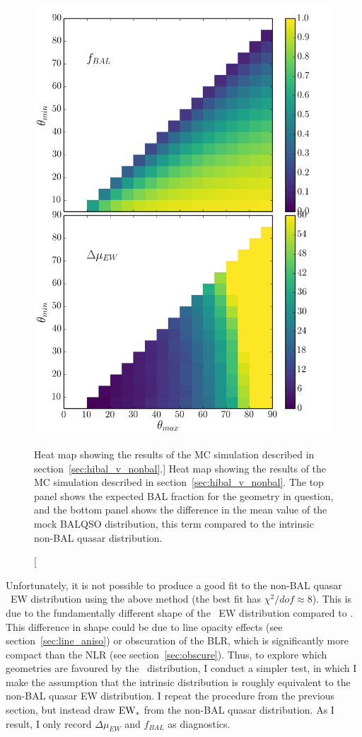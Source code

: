 \begin{figure} %
\centering
\includegraphics[width=1.0\textwidth]{figures/ewpaper/faceon_ew_c4_faceon_sdss.png}
\caption
[Heat map showing the results of the MC simulation described in 
section~\ref{sec:hibal_v_nonbal}.]
{
Heat map showing the results of the MC simulation described in 
section~\ref{sec:hibal_v_nonbal}. The top panel shows the expected 
BAL fraction for the geometry in question, and the bottom
panel shows the difference in the mean value of the mock BALQSO distribution,
this term compared to the intrinsic non-BAL quasar distribution.
}
\label{fig:c4_faceon}
\end{figure} %

Unfortunately, it is not possible to produce a good fit to 
the non-BAL quasar \civline\ EW distribution using the above method 
(the best fit has $\chi^2/dof\approx8$).
This is due to the fundamentally different shape of the \civ\ EW distribution 
compared to \oiii. This difference in shape could be due to line opacity effects 
(see section~\ref{sec:line_aniso}) or obscuration of the BLR, which is significantly
more compact than the NLR (see section~\ref{sec:obscure}).
Thus, to explore which geometries are favoured by the \civ\ distribution,
I conduct a simpler test, in which I make the assumption that the intrinsic
distribution is roughly equivalent to the non-BAL quasar EW distribution.
I repeat the procedure from the previous section, but instead draw ${\rm EW}_*$
from the non-BAL quasar distribution. As I result, I only record $\Delta \mu_{EW}$
and $f_{BAL}$ as diagnostics. 

